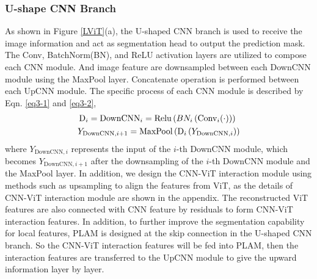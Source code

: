 \documentclass[lettersize,journal]{IEEEtran}
\begin{document}
\subsubsection{U-shape CNN Branch}
As shown in Figure \ref{LViT}(a), the U-shaped CNN branch is used to receive the image information and act as segmentation head to output the prediction mask. The Conv, BatchNorm(BN), and ReLU activation layers are utilized to compose each CNN module. And image feature are downsampled between each DownCNN module using the MaxPool layer. Concatenate operation is performed between each UpCNN module. The specific process of each CNN module is described by Eqn. \ref{eq3-1} and \ref{eq3-2},
\begin{eqnarray}
    &\operatorname{D}_{i}=\operatorname{DownCNN}_{i}=\operatorname{Relu}\left(B N_{i}\left(\operatorname{Conv}_{i}(\cdot)\right)\right)\vspace{1ex}
    \label{eq3-1}
    \\
    &Y_{\text {DownCNN}, i+1}=\operatorname{MaxPool}\left(\operatorname{D}_{i}\left(Y_{\text{DownCNN},i}\right)\right)
    \label{eq3-2}
\end{eqnarray}
where $Y_{\text{DownCNN},i}$ represents the input of the $i$-th DownCNN module, which becomes $Y_{\text{DownCNN},i+1}$ after the downsampling of the $i$-th DownCNN module and the MaxPool layer. In addition, we design the CNN-ViT interaction module using methods such as upsampling to align the features from ViT, as the details of CNN-ViT interaction module are shown in the appendix. The reconstructed ViT features are also connected with CNN feature by residuals to form CNN-ViT interaction features. In addition, to further improve the segmentation capability for local features, PLAM is designed at the skip connection in the U-shaped CNN branch. So the CNN-ViT interaction features will be fed into PLAM, then the interaction features are transferred to the UpCNN module to give the upward information layer by layer.
\end{document}
